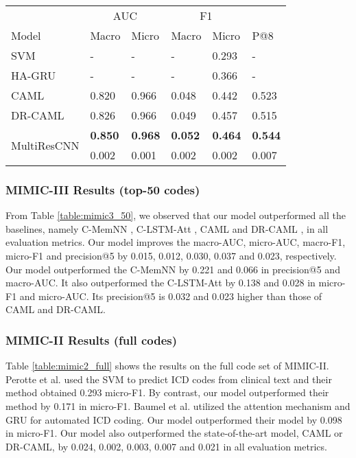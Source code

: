 \documentclass[letterpaper]{article} \usepackage{aaai20}  \usepackage{times}  \usepackage{helvet} \usepackage{courier}  \usepackage[hyphens]{url}  \usepackage{graphicx} \urlstyle{rm} \def\UrlFont{\rm}  \usepackage{graphicx}  \frenchspacing  \setlength{\pdfpagewidth}{8.5in}  \setlength{\pdfpageheight}{11in}
\begin{document}
\begin{table*}[t]
\centering
\caption{MIMIC-II results (full codes). The results of MultiResCNN are shown in means  standard deviations.}\smallskip
\begin{tabular}{l|ll|ll|l}
\hline
& \multicolumn{2}{|c|}{AUC} & \multicolumn{2}{|c|}{F1} &  \\
Model & Macro & Micro & Macro & Micro & P@8 \\
\hline
SVM \cite{perotte2013diagnosis} & - & - & - & 0.293 & - \\
HA-GRU \cite{baumel2018multi} & - & - & - & 0.366 & - \\ 
CAML \cite{mullenbach2018explainable} & 0.820 & 0.966 & 0.048 & 0.442 & 0.523  \\
DR-CAML \cite{mullenbach2018explainable} & 0.826 & 0.966 & 0.049 & 0.457 & 0.515  \\
\hline
\multirow{2}{*}{MultiResCNN} & \textbf{0.850} & \textbf{0.968} & \textbf{0.052} & \textbf{0.464} &  \textbf{0.544} \\
& 0.002  & 0.001 & 0.002 & 0.002 &  0.007 \\
\hline
\end{tabular}
\label{table:mimic2_full}
\end{table*}

\subsubsection{MIMIC-III Results (top-50 codes)}



From Table \ref{table:mimic3_50}, we observed that our model outperformed all the baselines, namely C-MemNN \cite{prakash2017condensed}, C-LSTM-Att \cite{shi2017towards}, CAML and DR-CAML \cite{mullenbach2018explainable}, in all evaluation metrics. Our model improves the macro-AUC, micro-AUC, macro-F1, micro-F1 and precision@5 by 0.015, 0.012, 0.030, 0.037 and 0.023, respectively. Our model outperformed the C-MemNN by 0.221 and 0.066 in precision@5 and macro-AUC. It also outperformed the C-LSTM-Att by 0.138 and 0.028 in micro-F1 and micro-AUC. Its precision@5 is 0.032 and 0.023 higher than those of CAML and DR-CAML. 



\subsubsection{MIMIC-II Results (full codes)}

Table \ref{table:mimic2_full} shows the results on the full code set of MIMIC-II. Perotte et al.  used the SVM to predict ICD codes from clinical text and their method obtained 0.293 micro-F1. By contrast, our model outperformed their method by 0.171 in micro-F1. Baumel et al.  utilized the attention mechanism and GRU for automated ICD coding. Our model outperformed their model by 0.098 in micro-F1. Our model also outperformed the state-of-the-art model, CAML or DR-CAML, by 0.024, 0.002, 0.003, 0.007 and 0.021 in all evaluation metrics.
\end{document}

